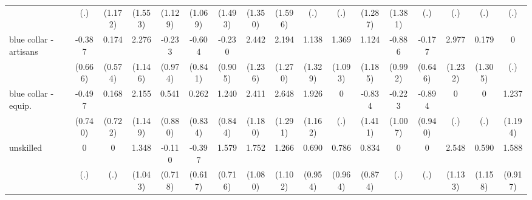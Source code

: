 {\begin{tabular}{l*{16}{c}}
                    &         (.)         &     (1.172)         &     (1.553)         &     (1.129)         &     (1.069)         &     (1.493)         &     (1.350)         &     (1.596)         &         (.)         &         (.)         &     (1.287)         &     (1.381)         &         (.)         &         (.)         &         (.)         &         (.)         \\
[1em]
blue collar - artisans&      -0.387         &       0.174         &       2.276\sym{*}  &      -0.233         &      -0.604         &      -0.230         &       2.442\sym{*}  &       2.194         &       1.138         &       1.369         &       1.124         &      -0.886         &      -0.177         &       2.977\sym{*}  &       0.179         &           0         \\
                    &     (0.666)         &     (0.574)         &     (1.146)         &     (0.974)         &     (0.841)         &     (0.905)         &     (1.236)         &     (1.270)         &     (1.329)         &     (1.093)         &     (1.185)         &     (0.992)         &     (0.646)         &     (1.232)         &     (1.305)         &         (.)         \\
[1em]
blue collar - equip.&      -0.497         &       0.168         &       2.155         &       0.541         &       0.262         &       1.240         &       2.411\sym{*}  &       2.648\sym{*}  &       1.926         &           0         &      -0.834         &      -0.223         &      -0.894         &           0         &           0         &       1.237         \\
                    &     (0.740)         &     (0.722)         &     (1.149)         &     (0.880)         &     (0.834)         &     (0.844)         &     (1.180)         &     (1.291)         &     (1.162)         &         (.)         &     (1.411)         &     (1.007)         &     (0.940)         &         (.)         &         (.)         &     (1.194)         \\
[1em]
unskilled           &           0         &           0         &       1.348         &      -0.110         &      -0.397         &       1.579\sym{*}  &       1.752         &       1.266         &       0.690         &       0.786         &       0.834         &           0         &           0         &       2.548\sym{*}  &       0.590         &       1.588         \\
                    &         (.)         &         (.)         &     (1.043)         &     (0.718)         &     (0.617)         &     (0.716)         &     (1.080)         &     (1.102)         &     (0.954)         &     (0.964)         &     (0.874)         &         (.)         &         (.)         &     (1.133)         &     (1.158)         &     (0.917)         \\

\end{tabular}}
